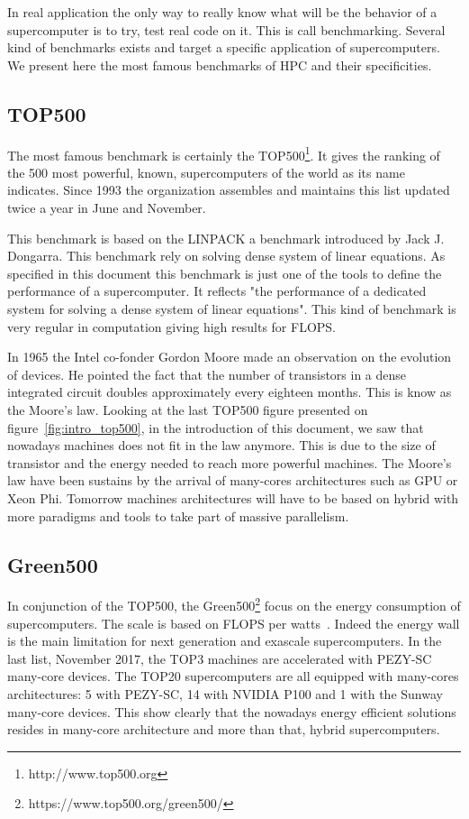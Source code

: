 In real application the only way to really know what will be the behavior of a supercomputer is to try, test real code on it. 
This is call benchmarking.
Several kind of benchmarks exists and target a specific application of supercomputers. 
We present here the most famous benchmarks of HPC and their specificities.

\subsection{TOP500}
The most famous benchmark is certainly the TOP500\footnote{http://www.top500.org}. 
It gives the ranking of the 500 most powerful, known, supercomputers of the world as its name indicates.
Since 1993 the organization assembles and maintains this list updated twice a year in June and November.

This benchmark is based on the LINPACK\cite{dongarra1994top500} a benchmark introduced by Jack J. Dongarra.
This benchmark rely on solving  dense system of linear equations. 
As specified in this document this benchmark is just one of the tools to define the performance of a supercomputer. 
It reflects "the performance of a dedicated system for solving a dense system of linear equations".
This kind of benchmark is very regular in computation giving high results for FLOPS. 

In 1965 the Intel co-fonder Gordon Moore made an observation\cite{present2000cramming} on the evolution of devices. 
He pointed the fact that the number of transistors in a dense integrated circuit doubles approximately every eighteen months.
This is know as the Moore's law. 
Looking at the last TOP500 figure presented on figure~\ref{fig:intro_top500}, in the introduction of this document, we saw that nowadays machines does not fit in the law anymore. 
This is due to the size of transistor and the energy needed to reach more powerful machines. 
The Moore's law have been sustains by the arrival of many-cores architectures such as GPU or Xeon Phi. 
Tomorrow machines architectures will have to be based on hybrid with more paradigms and tools to take part of massive parallelism.


\subsection{Green500}
In conjunction of the TOP500, the Green500\footnote{https://www.top500.org/green500/} focus on the energy consumption of supercomputers. 
The scale is based on FLOPS per watts~\cite{feng2007green500}.
Indeed the energy wall is the main limitation for next generation and exascale supercomputers. 
In the last list, November 2017, the TOP3 machines are accelerated with PEZY-SC many-core devices. 
The TOP20 supercomputers are all equipped with many-cores architectures: 5 with PEZY-SC, 14 with NVIDIA P100 and 1 with the Sunway many-core devices. 
This show clearly that the nowadays energy efficient solutions resides in many-core architecture and more than that, hybrid supercomputers. 

